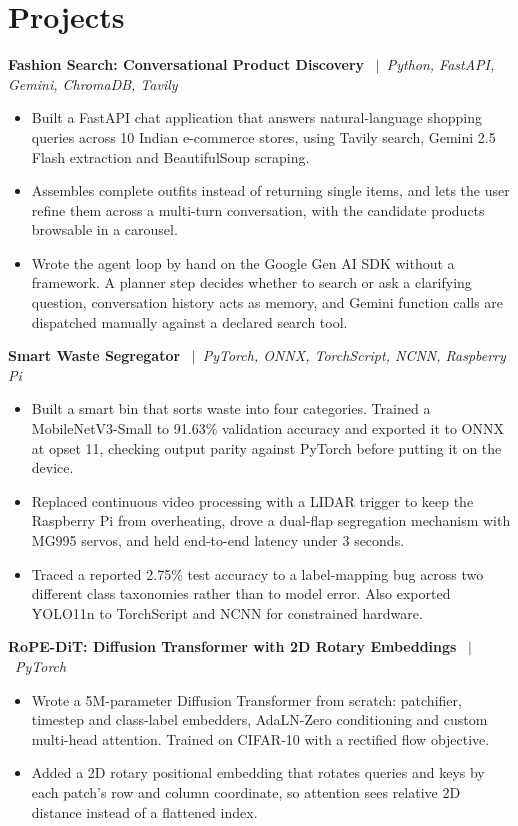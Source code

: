 \documentclass[a4paper,9pt]{extarticle}
\newcommand{\sep}{\ $\vert$\ }
\begin{document}
\section*{Projects}

\textbf{Fashion Search: Conversational Product Discovery} \sep \textit{Python, FastAPI, Gemini, ChromaDB, Tavily}
\begin{itemize}
  \item Built a FastAPI chat application that answers natural-language shopping queries across 10 Indian e-commerce stores, using Tavily search, Gemini 2.5 Flash extraction and BeautifulSoup scraping.
  \item Assembles complete outfits instead of returning single items, and lets the user refine them across a multi-turn conversation, with the candidate products browsable in a carousel.
  \item Wrote the agent loop by hand on the Google Gen AI SDK without a framework. A planner step decides whether to search or ask a clarifying question, conversation history acts as memory, and Gemini function calls are dispatched manually against a declared search tool.
\end{itemize}
\vspace{3pt}

\textbf{Smart Waste Segregator} \sep \textit{PyTorch, ONNX, TorchScript, NCNN, Raspberry Pi}
\begin{itemize}
  \item Built a smart bin that sorts waste into four categories. Trained a MobileNetV3-Small to 91.63\% validation accuracy and exported it to ONNX at opset 11, checking output parity against PyTorch before putting it on the device.
  \item Replaced continuous video processing with a LIDAR trigger to keep the Raspberry Pi from overheating, drove a dual-flap segregation mechanism with MG995 servos, and held end-to-end latency under 3 seconds.
  \item Traced a reported 2.75\% test accuracy to a label-mapping bug across two different class taxonomies rather than to model error. Also exported YOLO11n to TorchScript and NCNN for constrained hardware.
\end{itemize}
\vspace{3pt}

\textbf{RoPE-DiT: Diffusion Transformer with 2D Rotary Embeddings} \sep \textit{PyTorch}
\begin{itemize}
  \item Wrote a 5M-parameter Diffusion Transformer from scratch: patchifier, timestep and class-label embedders, AdaLN-Zero conditioning and custom multi-head attention. Trained on CIFAR-10 with a rectified flow objective.
  \item Added a 2D rotary positional embedding that rotates queries and keys by each patch's row and column coordinate, so attention sees relative 2D distance instead of a flattened index.
\end{itemize}
\vspace{3pt}
\end{document}
